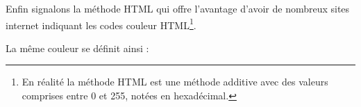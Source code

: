 \begin{latexcode}
\end{latexcode}

Enfin signalons la méthode HTML qui offre l'avantage d'avoir de nombreux sites internet indiquant les codes couleur HTML\footnote{En réalité la méthode HTML est une méthode additive avec des valeurs comprises entre 0 et 255, notées en hexadécimal.}.

La même couleur se définit ainsi :

\begin{latexcode}
\end{latexcode}




